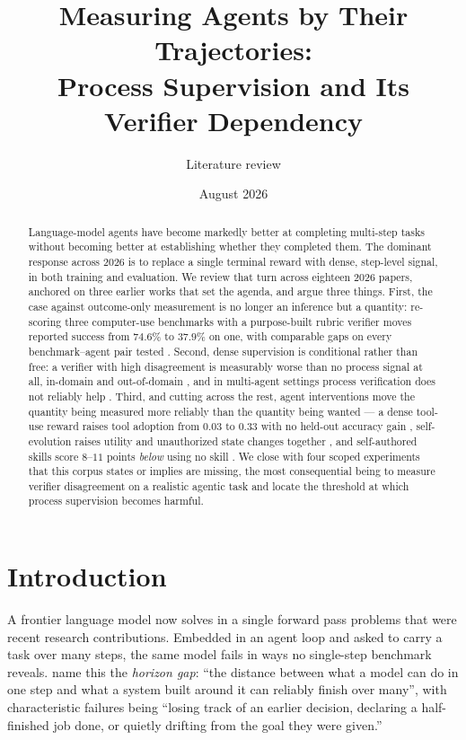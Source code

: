 \documentclass[10pt,twocolumn,a4paper]{article}
\title{Measuring Agents by Their Trajectories:\\
Process Supervision and Its Verifier Dependency}
\author{Literature review}
\date{August 2026}
\begin{document}
\maketitle

\begin{abstract}
Language-model agents have become markedly better at completing multi-step tasks
without becoming better at establishing whether they completed them.
The dominant response across 2026 is to replace a single terminal reward with dense,
step-level signal, in both training and evaluation.
We review that turn across eighteen 2026 papers, anchored on three earlier works that set
the agenda, and argue three things.
First, the case against outcome-only measurement is no longer an inference but a quantity:
re-scoring three computer-use benchmarks with a purpose-built rubric verifier moves reported
success from $74.6\%$ to $37.9\%$ on one, with comparable gaps on every benchmark--agent pair
tested \citep{rosset2026artbuildingverifierscomputer}.
Second, dense supervision is conditional rather than free: a verifier with high
disagreement is measurably worse than no process signal at all, in-domain and
out-of-domain \citep{yuan2026verifiableprocessrewardsagentic}, and in multi-agent settings
process verification does not reliably help
\citep{venkataramani2026masproveunderstandingprocessverification}.
Third, and cutting across the rest, agent interventions move the quantity being measured
more reliably than the quantity being wanted --- a dense tool-use reward raises tool
adoption from $0.03$ to $0.33$ with no held-out accuracy gain
\citep{fan2026screenshotstoolselicitingtool}, self-evolution raises utility and
unauthorized state changes together \citep{li2026auditingselfevolutionfinancialagents}, and
self-authored skills score $8$--$11$ points \emph{below} using no skill
\citep{peng2026writeexecuterefineskill}.
We close with four scoped experiments that this corpus states or implies are missing, the
most consequential being to measure verifier disagreement on a realistic agentic task and
locate the threshold at which process supervision becomes harmful.
\end{abstract}

\section{Introduction}

A frontier language model now solves in a single forward pass problems that were recent
research contributions.
Embedded in an agent loop and asked to carry a task over many steps, the same model
fails in ways no single-step benchmark reveals.
\citet{chen2026horizongapplanningmemory} name this the \emph{horizon gap}: ``the distance
between what a model can do in one step and what a system built around it can reliably
finish over many'', with characteristic failures being ``losing track of an earlier
decision, declaring a half-finished job done, or quietly drifting from the goal they were
given.''
\end{document}

